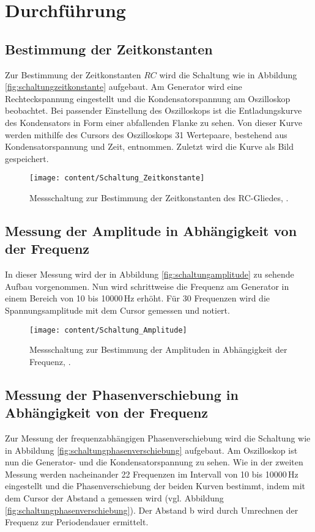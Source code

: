\section{Durchführung}
\label{sec:Durchführung}

\subsection{Bestimmung der Zeitkonstanten}
Zur Bestimmung der Zeitkonstanten $RC$ wird die Schaltung wie in Abbildung \eqref{fig:schaltungzeitkonstante} aufgebaut.
Am Generator wird eine Rechteckspannung eingestellt und die Kondensatorspannung am Oszilloskop beobachtet. Bei passender Einstellung
des Oszilloskops ist die Entladungskurve des Kondensators in Form einer abfallenden Flanke zu sehen.
Von dieser Kurve werden mithilfe des Cursors des Oszilloskops 31 Wertepaare, bestehend aus Kondensatorspannung und Zeit, entnommen. Zuletzt
wird die Kurve als Bild gespeichert.

\begin{figure}[h!]
	\centering
	\texttt{[image: content/Schaltung\_Zeitkonstante]}
	\caption{Messschaltung zur Bestimmung der Zeitkonstanten des RC-Gliedes, \cite[6]{anleitung353}.}
	\label{fig:schaltungzeitkonstante}
\end{figure}


\subsection{Messung der Amplitude in Abhängigkeit von der Frequenz}
In dieser Messung wird der in Abbildung \eqref{fig:schaltungamplitude} zu sehende Aufbau vorgenommen. Nun wird schrittweise die Frequenz am Generator in 
einem Bereich von 10 bis 10000\,Hz erhöht. Für 30 Frequenzen wird die Spannungsamplitude mit dem Cursor gemessen und notiert.

\begin{figure}[h!]
	\centering
	\texttt{[image: content/Schaltung\_Amplitude]}
	\caption{Messschaltung zur Bestimmung der Amplituden in Abhängigkeit der Frequenz, \cite[7]{anleitung353}.}
	\label{fig:schaltungamplitude}
\end{figure}

\subsection{Messung der Phasenverschiebung in Abhängigkeit von der Frequenz}
Zur Messung der frequenzabhängigen Phasenverschiebung wird die Schaltung wie in Abbildung \eqref{fig:schaltungphasenverschiebung} aufgebaut. 
Am Oszilloskop ist nun die Generator- und die Kondensatorspannung zu sehen. Wie in der zweiten Messung werden nacheinander 22 Frequenzen im Intervall 
von 10 bis 10000\,Hz eingestellt und die Phasenverschiebung der beiden Kurven bestimmt, indem mit dem Cursor der Abstand a gemessen wird 
(vgl. Abbildung \eqref{fig:schaltungphasenverschiebung}). Der Abstand b wird durch Umrechnen der Frequenz zur Periodendauer ermittelt. 

